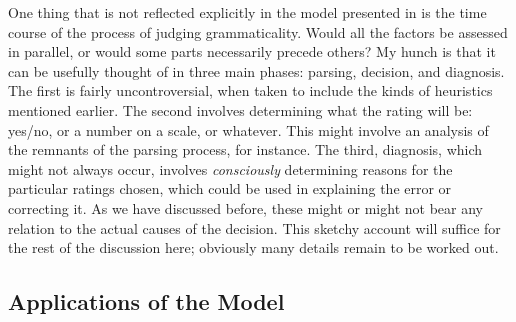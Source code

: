  One thing that is not reflected explicitly in the model presented in  is the time course of the process of judging grammaticality. Would all the factors be assessed in parallel, or would some parts necessarily precede others? My hunch is that it can be usefully thought of in three main phases: parsing, decision, and diagnosis. The first is fairly uncontroversial, when taken to include the kinds of heuristics mentioned earlier. The second involves determining what the rating will be: yes/no, or a number on a scale, or whatever. This might involve an analysis of the remnants of the parsing process, for instance. The third, diagnosis, which might not always occur, involves \textit{consciously} determining reasons for the particular ratings chosen, which could be used in explaining the error or correcting it. As we have discussed before, these might or might not bear any relation to the actual causes of the decision. This sketchy account will suffice for the rest of the discussion here; obviously many details remain to be worked out.


 \subsection{Applications of the Model}\label{sec:6.2.3}

